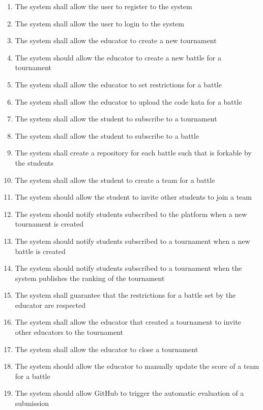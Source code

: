 \begin{enumerate}[label=R\arabic*:]
    \item The system shall allow the user to register to the system
    \item The system shall allow the user to login to the system
    \item The system shall allow the educator to create a new tournament
    \item The system should allow the educator to create a new battle for a tournament
    \item The system shall allow the educator to set restrictions for a battle
    \item The system shall allow the educator to upload the code kata for a battle
    \item The system shall allow the student to subscribe to a tournament
    \item The system shall allow the student to subscribe to a battle
    \item The system shall create a repository for each battle such that is forkable by the students
    \item The system shall allow the student to create a team for a battle
    \item The system should allow the student to invite other students to join a team
    \item The system should notify students subscribed to the platform when a new tournament is created
    \item The system should notify students subscribed to a tournament when a new battle is created
    \item The system should notify students subscribed to a tournament when the system publishes the ranking of the tournament
    \item The system shall guarantee that the restrictions for a battle set by the educator are respected
    \item The system shall allow the educator that created a tournament to invite other educators to the tournament
    \item The system shall allow the educator to close a tournament
    \item The system should allow the educator to manually update the score of a team for a battle
    \item The system should allow GitHub to trigger the automatic evaluation of a submission
\end{enumerate}

